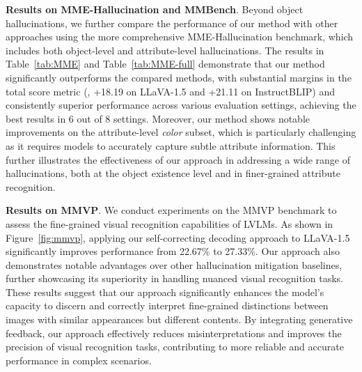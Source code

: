 \textbf{Results on MME-Hallucination and MMBench}. Beyond object hallucinations, we further compare the performance of our method with other approaches using the more comprehensive MME-Hallucination benchmark, which includes both object-level and attribute-level hallucinations. The results in Table~\ref{tab:MME} and Table~\ref{tab:MME-full}
demonstrate that our method significantly outperforms the compared methods, with substantial margins in the total score metric (\eg, +18.19 on LLaVA-1.5 and +21.11 on InstructBLIP) and consistently superior performance across various evaluation settings, achieving the best results in 6 out of 8 settings. Moreover, our method shows notable improvements on the attribute-level \textit{color} subset,  which is particularly challenging as it requires models to accurately capture subtle attribute information. This further illustrates the effectiveness of our approach in addressing a wide range of hallucinations, both at the object existence level and in finer-grained attribute recognition. 


\textbf{Results on MMVP}. We conduct experiments on the MMVP benchmark to assess the fine-grained visual recognition capabilities of LVLMs. As shown in Figure~\ref{fig:mmvp}, applying our self-correcting decoding approach to LLaVA-1.5 significantly improves performance from 22.67\% to 27.33\%.
Our approach also demonstrates notable advantages over other hallucination mitigation baselines, further showcasing its superiority in handling nuanced visual recognition tasks.
These results suggest that our approach significantly enhances the model’s capacity to discern and correctly interpret fine-grained distinctions between images with similar appearances but different contents. By integrating generative feedback, our approach effectively reduces misinterpretations and improves the precision of visual recognition tasks, contributing to more reliable and accurate performance in complex scenarios.



